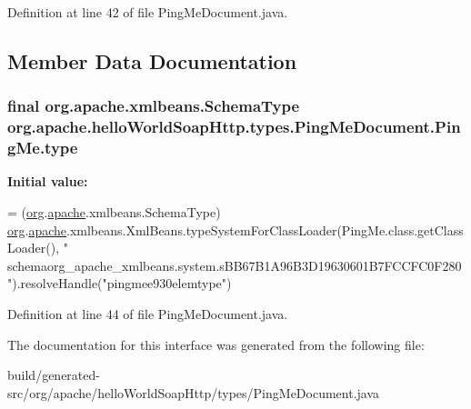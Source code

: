Definition at line 42 of file Ping\+Me\+Document.\+java.



\subsection{Member Data Documentation}
\hypertarget{interfaceorg_1_1apache_1_1hello_world_soap_http_1_1types_1_1_ping_me_document_1_1_ping_me_aeb8df88bb04d0b0354da421ede8b4bb8}{}
\subsubsection[{type}]{\setlength{\rightskip}{0pt plus 5cm}final org.\+apache.\+xmlbeans.\+Schema\+Type org.\+apache.\+hello\+World\+Soap\+Http.\+types.\+Ping\+Me\+Document.\+Ping\+Me.\+type\hspace{0.3cm}{\ttfamily [static]}}\label{interfaceorg_1_1apache_1_1hello_world_soap_http_1_1types_1_1_ping_me_document_1_1_ping_me_aeb8df88bb04d0b0354da421ede8b4bb8}
{\bfseries Initial value\+:}
\begin{DoxyCode}
= (\hyperlink{namespaceorg}{org}.\hyperlink{namespaceorg_1_1apache}{apache}.xmlbeans.SchemaType)
            \hyperlink{namespaceorg}{org}.\hyperlink{namespaceorg_1_1apache}{apache}.xmlbeans.XmlBeans.typeSystemForClassLoader(PingMe.class.getClassLoader(), \textcolor{stringliteral}{"
      schemaorg\_apache\_xmlbeans.system.sBB67B1A96B3D19630601B7FCCFC0F280"}).resolveHandle(\textcolor{stringliteral}{"pingmee930elemtype"})
\end{DoxyCode}


Definition at line 44 of file Ping\+Me\+Document.\+java.



The documentation for this interface was generated from the following file\+:\begin{DoxyCompactItemize}
\item 
build/generated-\/src/org/apache/hello\+World\+Soap\+Http/types/Ping\+Me\+Document.\+java\end{DoxyCompactItemize}
